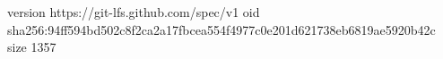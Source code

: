 version https://git-lfs.github.com/spec/v1
oid sha256:94ff594bd502c8f2ca2a17fbcea554f4977c0e201d621738eb6819ae5920b42c
size 1357
